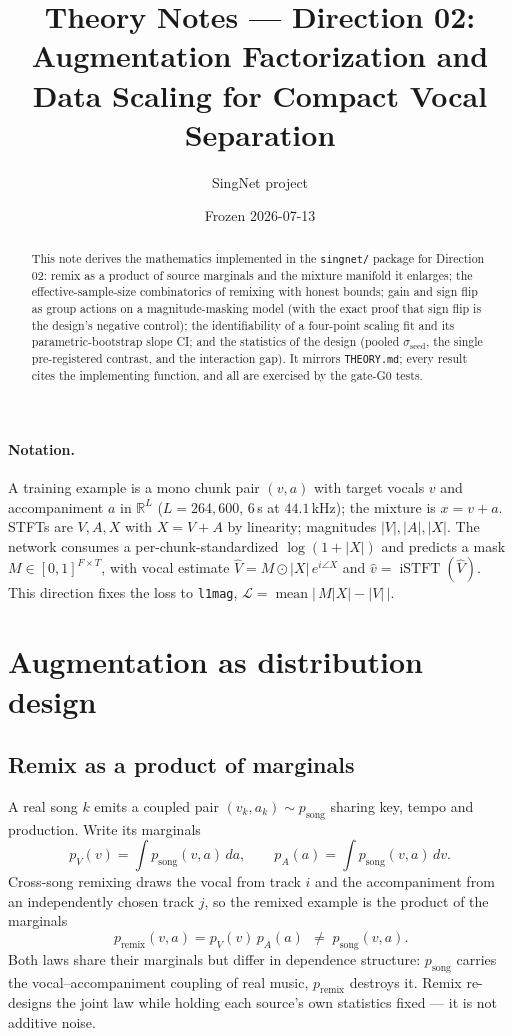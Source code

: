 \documentclass[11pt]{article}
\title{Theory Notes --- Direction 02:\\ Augmentation Factorization and Data
Scaling for Compact Vocal Separation}
\author{SingNet project}
\date{Frozen 2026-07-13}
\newcommand{\code}[1]{\texttt{#1}}
\newcommand{\iSTFT}{\operatorname{iSTFT}}
\newcommand{\mean}{\operatorname{mean}}
\begin{document}
\maketitle

\begin{abstract}
This note derives the mathematics implemented in the \code{singnet/} package for
Direction 02: remix as a product of source marginals and the mixture manifold it
enlarges; the effective-sample-size combinatorics of remixing with honest bounds;
gain and sign flip as group actions on a magnitude-masking model (with the exact
proof that sign flip is the design's negative control); the identifiability of a
four-point scaling fit and its parametric-bootstrap slope CI; and the statistics of
the design (pooled $\sigma_{\text{seed}}$, the single pre-registered contrast, and
the interaction gap). It mirrors \code{THEORY.md}; every result cites the
implementing function, and all are exercised by the gate-G0 tests.
\end{abstract}

\paragraph{Notation.} A training example is a mono chunk pair $(v,a)$ with target
vocals $v$ and accompaniment $a$ in $\mathbb R^{L}$ ($L=264{,}600$, $6$\,s at
$44.1$\,kHz); the mixture is $x=v+a$. STFTs are $V,A,X$ with $X=V+A$ by linearity;
magnitudes $|V|,|A|,|X|$. The network consumes a per-chunk-standardized
$\log(1+|X|)$ and predicts a mask $M\in[0,1]^{F\times T}$, with vocal estimate
$\widehat V=M\odot|X|\,e^{i\angle X}$ and $\hat v=\iSTFT(\widehat V)$. This direction
fixes the loss to \code{l1mag}, $\mathcal L=\mean\big|\,M|X|-|V|\,\big|$.

\section{Augmentation as distribution design}

\subsection{Remix as a product of marginals}

A real song $k$ emits a coupled pair $(v_k,a_k)\sim p_{\text{song}}$ sharing key,
tempo and production. Write its marginals
\[
p_V(v)=\int p_{\text{song}}(v,a)\,da,\qquad
p_A(a)=\int p_{\text{song}}(v,a)\,dv .
\]
Cross-song remixing draws the vocal from track $i$ and the accompaniment from an
independently chosen track $j$, so the remixed example is the product of the
marginals
\[
\boxed{\,p_{\text{remix}}(v,a)=p_V(v)\,p_A(a)\,}\;\ne\;p_{\text{song}}(v,a).
\]
Both laws share their marginals but differ in dependence structure:
$p_{\text{song}}$ carries the vocal--accompaniment coupling of real music,
$p_{\text{remix}}$ destroys it. Remix re-designs the joint law while holding each
source's own statistics fixed --- it is not additive noise.
\end{document}
